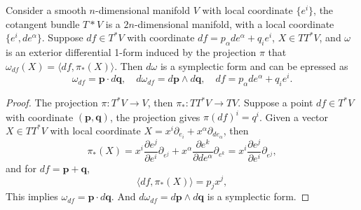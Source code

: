 \begin{theorem}
Consider a smooth $n$-dimensional manifold $V$ with local coordinate $\{e^i\}$, the cotangent bundle $T*V$ is a $2n$-dimensional manifold, with a local coordinate $\{e^i,de^\alpha\}$. Suppose $df\in T^*V$ with coordinate $df=p_\alpha de^\alpha+q_i e^i$, $X\in TT^*V$, and $\omega$ is an exterior differential 1-form induced by the projection $\pi$ that $\omega_{df}(X)=\langle df,\pi_*(X)\rangle$. Then $d\omega$ is a symplectic form and can be epressed as
\begin{equation}
\omega_{df}= \boldsymbol{p}\cdot d\boldsymbol{q},\quad d\omega_{df}=d\boldsymbol{p}\wedge d\boldsymbol{q},\quad df=p_\alpha de^\alpha+q_i e^i.
\end{equation}
\end{theorem}

\begin{proof}
The projection $\pi:T^*V\to V$, then $\pi_*:TT^*V\to TV$. Suppose a point $df\in T^*V$ with coordinate $(\boldsymbol{p},\boldsymbol{q})$, the projection gives $\pi(df)^i=q^i$. Given a vector $X\in TT^*V$ with local coordinate $X=x^i\partial_{e_i}+x^\alpha\partial_{de_\alpha}$, then
\begin{equation}
\pi_*(X)=x^i\frac{\partial e^j}{\partial e^i}\partial_{e^j}+x^\alpha\frac{\partial e^k}{\partial de^\alpha}\partial_{e^k}=x^i\frac{\partial e^j}{\partial e^i}\partial_{e^j},
\end{equation}
and for $df=\boldsymbol{p}+\boldsymbol{q}$,
\begin{equation}
\langle df,\pi_*(X)\rangle = p_j x^j,
\end{equation}
This implies $\omega_{df}=\boldsymbol{p}\cdot d\boldsymbol{q}$. And $d\omega_{df}=d\boldsymbol{p}\wedge d\boldsymbol{q}$ is a symplectic form.
\end{proof}